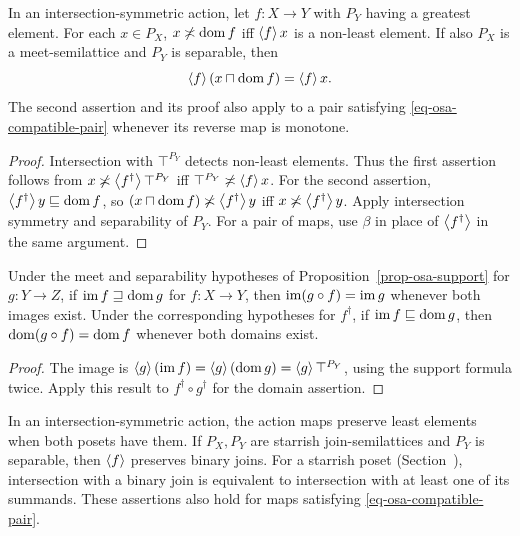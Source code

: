 \begin{prop}\label{prop-osa-support}
In an intersection-symmetric action, let $f:X\to Y$ with $P_Y$ having
a greatest element. For each $x\in P_X$, $x\not\asymp\operatorname{dom} f$ iff
$\left\langle f\right\rangle x$ is a non-least element. If also $P_X$ is a
meet-semilattice and $P_Y$ is separable, then
\[
 \left\langle f\right\rangle(x\sqcap\operatorname{dom} f)=\left\langle f\right\rangle x .
\]
The second assertion and its proof also
apply to a pair satisfying \eqref{eq-osa-compatible-pair} whenever its
reverse map is monotone.
\end{prop}

\begin{proof}
Intersection with $\top^{P_Y}$ detects non-least elements. Thus the first
assertion follows from
$x\not\asymp\left\langle f^\dagger\right\rangle\top^{P_Y}$ iff
$\top^{P_Y}\not\asymp\left\langle f\right\rangle x$. For the second assertion,
$\left\langle f^\dagger\right\rangle y\sqsubseteq\operatorname{dom} f$, so
$(x\sqcap\operatorname{dom} f)\not\asymp\left\langle f^\dagger\right\rangle y$ iff
$x\not\asymp\left\langle f^\dagger\right\rangle y$. Apply intersection symmetry and
separability of $P_Y$. For a pair of maps, use $\beta$ in place of
$\left\langle f^\dagger\right\rangle$ in the same argument.
\end{proof}

\begin{cor}\label{cor-osa-composite-image}
Under the meet and separability hypotheses of Proposition~\ref{prop-osa-support}
for $g:Y\to Z$, if $\operatorname{im} f\sqsupseteq\operatorname{dom} g$ for $f:X\to Y$, then
$\operatorname{im}(g\circ f)=\operatorname{im} g$ whenever both images exist. Under the
corresponding hypotheses for $f^\dagger$, if $\operatorname{im} f\sqsubseteq\operatorname{dom} g$,
then $\operatorname{dom}(g\circ f)=\operatorname{dom} f$ whenever both domains exist.
\end{cor}

\begin{proof}
The image is $\left\langle g\right\rangle(\operatorname{im} f)=\left\langle g\right\rangle(\operatorname{dom} g)=\left\langle g\right\rangle\top^{P_Y}$,
using the support formula twice. Apply this result to
$f^\dagger\circ g^\dagger$ for the domain assertion.
\end{proof}

\begin{prop}\label{prop-osa-pair-joins}
In an intersection-symmetric action, the action maps preserve least
elements when both posets have them. If $P_X,P_Y$ are starrish join-semilattices
and $P_Y$ is separable, then $\left\langle f\right\rangle$ preserves binary joins.
For a starrish poset (Section~),
intersection with a binary join is equivalent to intersection with
at least one of its summands. These assertions
also hold for maps satisfying \eqref{eq-osa-compatible-pair}.
\end{prop}

